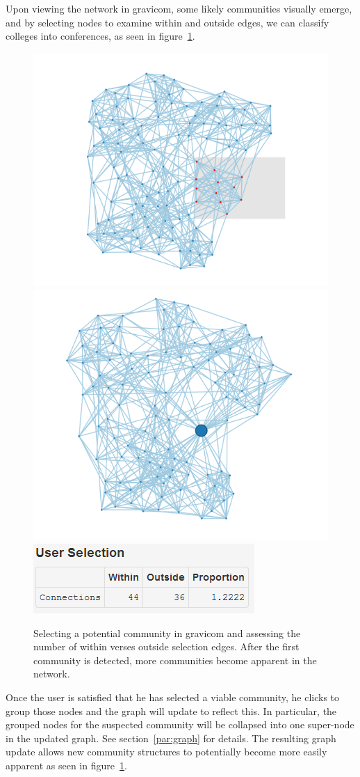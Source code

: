 \documentclass{article}\usepackage[]{graphicx}\usepackage[]{color}
\begin{document}
Upon viewing the network in gravicom, some likely communities visually emerge, and by selecting nodes to examine within and outside edges, we can classify colleges into conferences, as seen in figure~\ref{fig:football_2}.

\begin{figure}[H]
\centering
\includegraphics[width=.49\textwidth]{images/football_2.png}
\includegraphics[width=.49\textwidth]{images/football_4.png}
\includegraphics[]{images/football_3.png}
\caption{\label{fig:football_2} Selecting a potential community in gravicom and assessing the number of within verses outside selection edges. After the first community is detected, more communities become apparent in the network.}
\end{figure}

Once the user is satisfied that he has selected a viable community, he clicks to group those nodes and the graph will update to reflect this. In particular, the grouped nodes for the suspected community will be collapsed into one super-node in the updated graph. See section~\ref{par:graph} for details. The resulting graph update allows new community structures to potentially become more easily apparent as seen in figure~\ref{fig:football_2}. 
\end{document}
